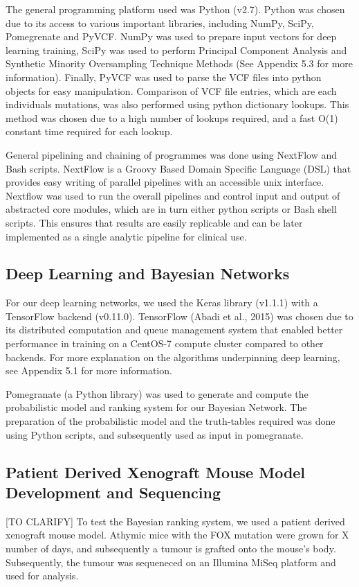 \documentclass{article}
\begin{document}
The general programming platform used was Python (v2.7). Python was chosen due to its access to various important libraries, including NumPy, SciPy, Pomegrenate and PyVCF. NumPy was used to prepare input vectors for deep learning training, SciPy was used to perform Principal Component Analysis and Synthetic Minority Oversampling Technique Methods (See Appendix 5.3 for more information). Finally, PyVCF was used to parse the VCF files into python objects for easy manipulation. Comparison of VCF file entries, which are each individuals mutations, was also performed using python dictionary lookups. This method was chosen due to a high number of lookups required, and a fast O(1) constant time required for each lookup.

General pipelining and chaining of programmes was done using NextFlow and Bash scripts. NextFlow is a Groovy Based Domain Specific Language (DSL) that provides easy writing of parallel pipelines with an accessible unix interface. Nextflow was used to run the overall pipelines and control input and output of abstracted core modules, which are in turn either python scripts or Bash shell scripts. This ensures that results are easily replicable and can be later implemented as a single analytic pipeline for clinical use.

\subsection{Deep Learning and Bayesian Networks}
For our deep learning networks, we used the Keras library (v1.1.1) with a TensorFlow backend (v0.11.0). TensorFlow (Abadi et al., 2015) was chosen due to its distributed computation and queue management system that enabled better performance in training on a CentOS-7 compute cluster compared to other backends. For more explanation on the algorithms underpinning deep learning, see Appendix 5.1 for more information.

Pomegranate (a Python library) was used to generate and compute the probabilistic model and ranking system for our Bayesian Network. The preparation of the probabilistic model and the truth-tables required was done using Python scripts, and subsequently used as input in pomegranate.

\subsection{Patient Derived Xenograft Mouse Model Development and Sequencing}
[TO CLARIFY] To test the Bayesian ranking system, we used a patient derived xenograft mouse model. Athymic mice with the FOX mutation were grown for X number of days, and subsequently a tumour is grafted onto the mouse's body. Subsequently, the tumour was sequeneced on an Illumina MiSeq platform and used for analysis. 
\end{document}
